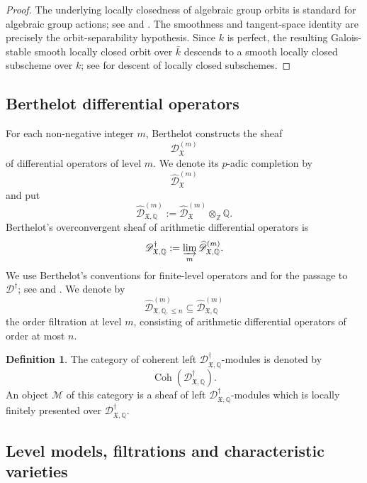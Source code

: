 \documentclass[11pt]{amsart}
\theoremstyle{plain}
\theoremstyle{definition}
\newtheorem{definition}{Definition}[section]
\theoremstyle{remark}
\newcommand{\Coh}{\operatorname{Coh}}
\begin{document}
\begin{proof}
The underlying locally closedness of algebraic group orbits is standard for
algebraic group actions; see \cite[Section 1.2]{ChrissGinzburg} and
\cite[Section 1.2]{HottaTakeuchiTanisaki}.  The smoothness and tangent-space
identity are precisely the orbit-separability hypothesis.  Since \(k\) is
perfect, the resulting Galois-stable smooth locally closed orbit over \(\bar k\)
descends to a smooth locally closed subscheme over \(k\); see
\cite[\S2.7]{EGAIV} for descent of locally closed subschemes.
\end{proof}

\subsection{Berthelot differential operators}

For each non-negative integer \(m\), Berthelot constructs the sheaf
\[
  \mathscr D^{(m)}_{\mathfrak X}
\]
of differential operators of level \(m\). We denote its \(p\)-adic completion by
\[
  \widehat{\mathscr D}^{(m)}_{\mathfrak X}
\]
and put
\[
  \widehat{\mathscr D}^{(m)}_{\mathfrak X,\mathbb Q}
  :=
  \widehat{\mathscr D}^{(m)}_{\mathfrak X}\otimes_{\mathbb Z}\mathbb Q.
\]
Berthelot's overconvergent sheaf of arithmetic differential operators is
\[
  \mathscr D^\dagger_{\mathfrak X,\mathbb Q}
  :=
  \varinjlim_m
  \widehat{\mathscr D}^{(m)}_{\mathfrak X,\mathbb Q}.
\]
We use Berthelot's conventions for finite-level operators and for the passage
to \(\mathscr D^\dagger\); see \cite[Sections 2.2 and 3]{BerthelotDModules} and
\cite[5.2--5.3]{BerthelotIntro}.  We denote by
\[
  \widehat{\mathscr D}^{(m)}_{\mathfrak X,\mathbb Q,\leq n}
  \subseteq
  \widehat{\mathscr D}^{(m)}_{\mathfrak X,\mathbb Q}
\]
the order filtration at level \(m\), consisting of arithmetic differential
operators of order at most \(n\).

\begin{definition}
\label{def:coherent-Ddagger}
The category of coherent left \(\mathscr D^\dagger_{\mathfrak X,\mathbb Q}\)-modules is denoted by
\[
  \Coh(\mathscr D^\dagger_{\mathfrak X,\mathbb Q}).
\]
An object \(\mathcal M\) of this category is a sheaf of left
\(\mathscr D^\dagger_{\mathfrak X,\mathbb Q}\)-modules which is locally finitely
presented over \(\mathscr D^\dagger_{\mathfrak X,\mathbb Q}\).
\end{definition}

\subsection{Level models, filtrations and characteristic varieties}
\end{document}
